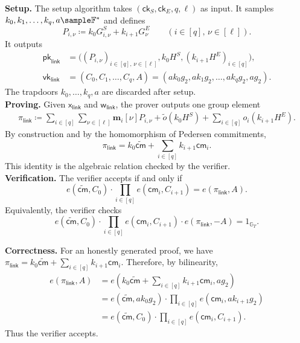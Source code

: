 \documentclass[conference,compsoc]{IEEEtran}
\newcommand{\cm}{\textsf{cm}}
\newcommand{\ck}{\textsf{ck}}
\newcommand{\vect}{\mathbf}         %
\renewcommand{\pk}{{\textsf{pk}}}
\renewcommand{\vk}{{\textsf{vk}}}
\renewcommand{\ck}{{\textsf{ck}}}
\newcommand{\stmt}{\mathsf{x}}      %
\newcommand{\wit}{\mathsf{w}}       %
\theoremstyle{plain}
\theoremstyle{definition}
\theoremstyle{remark}
\begin{document}
\noindent\textbf{Setup.}
The setup algorithm takes \((\ck_S,\ck_E,q,\ell)\) as input.  It samples
\(k_0,k_1,\ldots,k_q,a\sample\mathbb{F}^{\ast}\) and defines
\[
  P_{i,\nu} \coloneqq k_0G^S_{i,\nu}+k_{i+1}G^E_{\nu}
  \qquad
  (i\in[q],\,\nu\in[\ell]).
\]
It outputs
\[
\begin{aligned}
  \pk_{\mathsf{link}}
  &=
  \Big(
    (P_{i,\nu})_{i\in[q],\,\nu\in[\ell]},
    k_0H^S,
    (k_{i+1}H^E)_{i\in[q]}
  \Big), \\
  \vk_{\mathsf{link}}
  &=
  (C_0,C_1,\ldots,C_q,A)
  =
  (ak_0g_2,ak_1g_2,\ldots,ak_qg_2,ag_2).
\end{aligned}
\]
The trapdoors \(k_0,\ldots,k_q,a\) are discarded after setup. \\

\noindent\textbf{Proving.}
Given \(\stmt_{\mathsf{link}}\) and \(\wit_{\mathsf{link}}\), the prover
outputs one group element
\[
\begin{aligned}
  \pi_{\mathsf{link}}
  \coloneqq
  \sum_{i\in[q]}\sum_{\nu\in[\ell]}
  \vect{m}_i[\nu]P_{i,\nu}
  +
  \widetilde{o}(k_0H^S)
  +
  \sum_{i\in[q]} o_i(k_{i+1}H^E).
\end{aligned}
\]
By construction and by the homomorphism of Pedersen commitments,
\[
  \pi_{\mathsf{link}}
  =
  k_0\widetilde{\cm}
  +
  \sum_{i\in[q]} k_{i+1}\cm_i .
\]
This identity is the algebraic relation checked by the verifier. \\

\noindent\textbf{Verification.}
The verifier accepts if and only if
\[
  e(\widetilde{\cm},C_0)
  \cdot
  \prod_{i\in[q]} e(\cm_i,C_{i+1})
  =
  e(\pi_{\mathsf{link}},A).
\]
Equivalently, the verifier checks
\[
  e(\widetilde{\cm},C_0)
  \cdot
  \prod_{i\in[q]} e(\cm_i,C_{i+1})
  \cdot
  e(\pi_{\mathsf{link}},-A)
  =
  1_{\mathbb{G}_T}.
\]

\noindent\textbf{Correctness.}
For an honestly generated proof, we have
\(\pi_{\mathsf{link}}=k_0\widetilde{\cm}+\sum_{i\in[q]}k_{i+1}\cm_i\).
Therefore, by bilinearity,
\[
\begin{aligned}
  e(\pi_{\mathsf{link}},A)
  &=
  e\!\left(k_0\widetilde{\cm}+\sum_{i\in[q]}k_{i+1}\cm_i,ag_2\right)
  \\
  &=
  e(\widetilde{\cm},ak_0g_2)
  \cdot
  \prod_{i\in[q]} e(\cm_i,ak_{i+1}g_2)
  \\
  &=
  e(\widetilde{\cm},C_0)
  \cdot
  \prod_{i\in[q]} e(\cm_i,C_{i+1}).
\end{aligned}
\]
Thus the verifier accepts. \\
\end{document}

